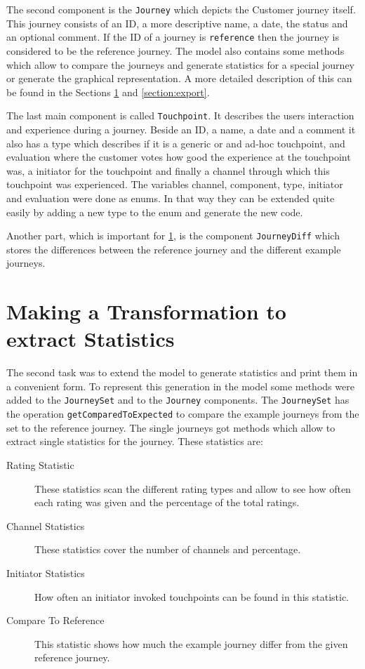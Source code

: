 \documentclass[12pt]{scrartcl}
\begin{document}
The second component is the \lstinline!Journey! which depicts the Customer journey itself. This journey consists of 
an ID, a more descriptive name, a date, the status and an optional comment. If the ID of a journey is 
\lstinline!reference! then the journey is considered to be the reference journey. The model also contains some 
methods which allow to compare the journeys and generate statistics for a special journey or generate the graphical
representation. A more detailed description of this can be found in the Sections \ref{section:statistic} and
\ref{section:export}.

The last main component is called \lstinline!Touchpoint!. It describes the users interaction and experience during
a journey. Beside an ID, a name, a date and a comment it also has a type which describes if it is a generic or
and ad-hoc touchpoint, and evaluation where the customer votes how good the experience at the touchpoint was, a 
initiator for the touchpoint and finally a channel through which this touchpoint was experienced. The variables
channel, component, type, initiator and evaluation were done as enums. In that way they can be extended quite
easily by adding a new type to the enum and generate the new code.

Another part, which is important for \ref{section:statistic}, is the component \lstinline!JourneyDiff! which stores
the differences between the reference journey and the different example journeys.

\section{Making a Transformation to extract Statistics} 
\label{section:statistic}

The second task was to extend the model to generate statistics and print them in a convenient form. To represent
this generation in the model some methods were added to the \lstinline!JourneySet! and to the \lstinline!Journey!
components. The \lstinline!JourneySet! has the operation \lstinline!getComparedToExpected! to compare the example 
journeys from the set to the reference journey. The single journeys got methods which allow to extract single
statistics for the journey. These statistics are:
\begin{description}
	\item[Rating Statistic] These statistics scan the different rating types and allow to see how often each rating
	was given and the percentage of the total ratings.
	\item[Channel Statistics] These statistics cover the number of channels and percentage.
	\item[Initiator Statistics] How often an initiator invoked touchpoints can be found in this statistic.
	\item[Compare To Reference] This statistic shows how much the example journey differ from the given reference
	journey.
\end{description}
\end{document}
